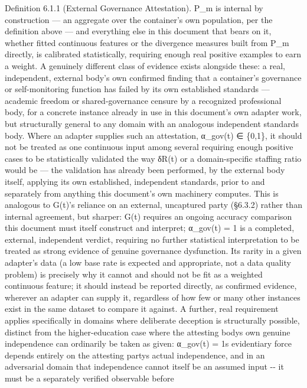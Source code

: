 \documentclass[
]{article}
\begin{document}
Definition 6.1.1 (External Governance Attestation). P\_m is internal by
construction --- an aggregate over the container's own population, per
the definition above --- and everything else in this document that bears
on it, whether fitted continuous features or the divergence measures
built from P\_m directly, is calibrated statistically, requiring enough
real positive examples to earn a weight. A genuinely different class of
evidence exists alongside these: a real, independent, external body's
own confirmed finding that a container's governance or self-monitoring
function has failed by its own established standards --- academic
freedom or shared-governance censure by a recognized professional body,
for a concrete instance already in use in this document's own adapter
work, but structurally general to any domain with an analogous
independent standards body. Where an adapter supplies such an
attestation, α\_gov(t) ∈ \{0,1\}, it should not be treated as one
continuous input among several requiring enough positive cases to be
statistically validated the way δR(t) or a domain-specific staffing
ratio would be --- the validation has already been performed, by the
external body itself, applying its own established, independent
standards, prior to and separately from anything this document's own
machinery computes. This is analogous to G(t)'s reliance on an external,
uncaptured party (§6.3.2) rather than internal agreement, but sharper:
G(t) requires an ongoing accuracy comparison this document must itself
construct and interpret; α\_gov(t) = 1 is a completed, external,
independent verdict, requiring no further statistical interpretation to
be treated as strong evidence of genuine governance dysfunction. Its
rarity in a given adapter's data (a low base rate is expected and
appropriate, not a data quality problem) is precisely why it cannot and
should not be fit as a weighted continuous feature; it should instead be
reported directly, as confirmed evidence, wherever an adapter can supply
it, regardless of how few or many other instances exist in the same
dataset to compare it against. A further, real requirement applies
specifically in domains where deliberate deception is structurally
possible, distinct from the higher-education case where the attesting
body\textquotesingle s own genuine independence can ordinarily be taken
as given: α\_gov(t) = 1\textquotesingle s evidentiary force depends
entirely on the attesting party\textquotesingle s actual independence,
and in an adversarial domain that independence cannot itself be an
assumed input -\/- it must be a separately verified observable before
\end{document}

